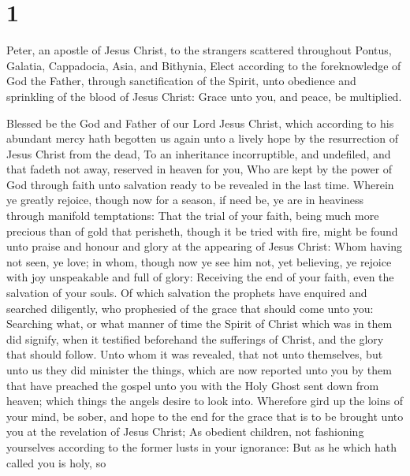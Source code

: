 \hypertarget{section}{%
\section{1}\label{section}}

 Peter, an apostle of Jesus Christ, to the strangers
scattered throughout Pontus, Galatia, Cappadocia, Asia, and Bithynia,
 Elect according to the foreknowledge of God the Father,
through sanctification of the Spirit, unto obedience and sprinkling of
the blood of Jesus Christ: Grace unto you, and peace, be multiplied.

 Blessed be the God and Father of our Lord Jesus Christ,
which according to his abundant mercy hath begotten us again unto a
lively hope by the resurrection of Jesus Christ from the dead,
 To an inheritance incorruptible, and undefiled, and that
fadeth not away, reserved in heaven for you,  Who are kept
by the power of God through faith unto salvation ready to be revealed in
the last time.  Wherein ye greatly rejoice, though now for
a season, if need be, ye are in heaviness through manifold temptations:
 That the trial of your faith, being much more precious
than of gold that perisheth, though it be tried with fire, might be
found unto praise and honour and glory at the appearing of Jesus Christ:
 Whom having not seen, ye love; in whom, though now ye see
him not, yet believing, ye rejoice with joy unspeakable and full of
glory:  Receiving the end of your faith, even the
salvation of your souls.  Of which salvation the prophets
have enquired and searched diligently, who prophesied of the grace that
should come unto you:  Searching what, or what manner of
time the Spirit of Christ which was in them did signify, when it
testified beforehand the sufferings of Christ, and the glory that should
follow.  Unto whom it was revealed, that not unto
themselves, but unto us they did minister the things, which are now
reported unto you by them that have preached the gospel unto you with
the Holy Ghost sent down from heaven; which things the angels desire to
look into.  Wherefore gird up the loins of your mind, be
sober, and hope to the end for the grace that is to be brought unto you
at the revelation of Jesus Christ;  As obedient children,
not fashioning yourselves according to the former lusts in your
ignorance:  But as he which hath called you is holy, so
